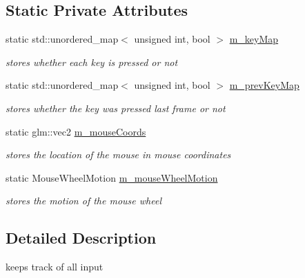 \subsection*{Static Private Attributes}
\begin{DoxyCompactItemize}
\item 
\mbox{\label{classnta_1_1InputManager_a00aa67b739a6762219dc97cc2e23c3f5}} 
static std\+::unordered\+\_\+map$<$ unsigned int, bool $>$ \hyperlink{classnta_1_1InputManager_a00aa67b739a6762219dc97cc2e23c3f5}{m\+\_\+key\+Map}
\begin{DoxyCompactList}\small\item\em stores whether each key is pressed or not \end{DoxyCompactList}\item 
\mbox{\label{classnta_1_1InputManager_a5fef83321ad801f59f5a4f3b2542db47}} 
static std\+::unordered\+\_\+map$<$ unsigned int, bool $>$ \hyperlink{classnta_1_1InputManager_a5fef83321ad801f59f5a4f3b2542db47}{m\+\_\+prev\+Key\+Map}
\begin{DoxyCompactList}\small\item\em stores whether the key was pressed last frame or not \end{DoxyCompactList}\item 
\mbox{\label{classnta_1_1InputManager_a9f0b4d6c78182a49313144c712cb460e}} 
static glm\+::vec2 \hyperlink{classnta_1_1InputManager_a9f0b4d6c78182a49313144c712cb460e}{m\+\_\+mouse\+Coords}
\begin{DoxyCompactList}\small\item\em stores the location of the mouse in mouse coordinates \end{DoxyCompactList}\item 
\mbox{\label{classnta_1_1InputManager_ae66e8c723d33a51ece6700e266191f01}} 
static Mouse\+Wheel\+Motion \hyperlink{classnta_1_1InputManager_ae66e8c723d33a51ece6700e266191f01}{m\+\_\+mouse\+Wheel\+Motion}
\begin{DoxyCompactList}\small\item\em stores the motion of the mouse wheel \end{DoxyCompactList}\end{DoxyCompactItemize}


\subsection{Detailed Description}
keeps track of all input 

